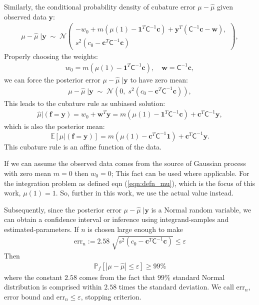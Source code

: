 \documentclass[twocolumn]{svjour3}          %
\newcommand{\bm}[1]{\boldsymbol{#1}}
\newcommand{\Ex}{\mathbb{E}}
\newcommand{\vc}{\bm{c}}
\newcommand{\vf}{\bm{f}}
\newcommand{\vw}{\bm{w}}
\newcommand{\vy}{\bm{y}}
\newcommand{\vone}{\bm{1}}
\newcommand{\mC}{\mathsf{C}}
\newcommand{\calN}{\mathcal{N}}
\newcommand{\hmu}{\hat{\mu}}
\newcommand{\errtol}{\varepsilon}
\newcommand{\errn}{\text{err}_{n}}
\newenvironment{nalign}{
    \begin{equation}
    \begin{aligned}
}{
    \end{aligned}
    \end{equation}
    \ignorespacesafterend
}
\begin{document}
Similarly, the conditional probability density of cubature error $\mu-\hmu$ given observed data $\vy$:
\begin{nalign}
\mu-\hmu\;|\vy
\; \sim \; \calN 
\left(
\begin{array}{cc}
-w_0 + m (\mu(1) - \vone^T  \mC^{-1}\vc )
+
\vy^T( \mC^{-1}\vc - \vw ),
\\
s^2 (c_0 - \vc^T\mC^{-1}\vc) 
\end{array}
\right),
\end{nalign}
Properly choosing the weights:
\begin{align*}
w_0 =  m (\mu(1) - \vone^T  \mC^{-1}\vc ),
\quad
\vw = \mC^{-1}\vc,
\end{align*}
we can force the posterior error $\mu-\hmu\;|\vy$ to have zero mean:
\begin{align*}
\mu-\hmu\;|\vy
\; \sim \; \calN 
\left(
0, \;
s^2 (c_0 - \vc^T\mC^{-1}\vc) 
\right)
,
\end{align*}
This leads to the cubature rule as unbiased solution:
\begin{align}
\label{eqn:BayesCub}
\widehat{\mu}  \vert ( \vf = \vy)
= w_0 + \vw^T \vy = 
m(\mu(1) - \vone^T  \mC^{-1}\vc )
+
\vc^T \mC^{-1} \vy,
\end{align}
which is also the posterior mean: 
\begin{equation} \label{eqn:BayesCub}
\Ex [\mu \vert ( \vf = \vy)] = m(\mu(1) -  \vc^T \mC^{-1}\vone) + \vc^T \mC^{-1}  \vy.
\end{equation}
This cubature rule is an affine function of the data.

If we can assume the observed data comes from the source of Gaussian process with zero mean $m=0$ then $w_0 = 0$; This fact can be used where applicable. For the integration problem as defined eqn (\ref{eqn:defn_mu}), which is the focus of this work, $\mu(1) = 1$. So, further in this work, we use the actual value instead.

Subsequently, since the posterior error $\mu-\hmu\;|\vy$ is a Normal random variable, we can obtain a confidence interval or inference using integrand-samples and estimated-parameters. If $n$ is chosen large enough to make
\begin{align}
\errn := 2.58 \; \sqrt{ s^2 (c_0 - \vc^T\mC^{-1}\vc) } \leq \errtol
\end{align}
Then
\begin{align}
\label{eqn_prob_confidence_interval}
\mathbb{P}_f \left[
|\mu-\hmu| \leq \errtol
\right] \geq 99\%
\end{align}
where the constant $2.58$ comes from the fact that $99\%$ standard Normal distribution is comprised within $2.58$ times the standard deviation. We call $\errn$, error bound and $\errn \leq \errtol$, stopping criterion.
\end{document}
